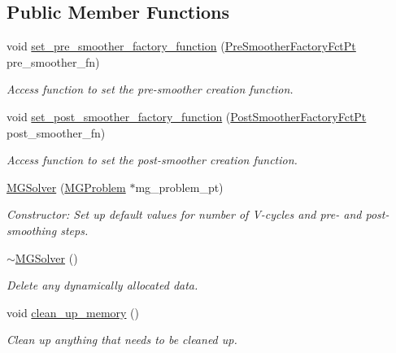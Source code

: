 \subsection*{Public Member Functions}
\begin{DoxyCompactItemize}
\item 
void \hyperlink{classoomph_1_1MGSolver_a0c783dddf9108f26b835509fddec6938}{set\+\_\+pre\+\_\+smoother\+\_\+factory\+\_\+function} (\hyperlink{classoomph_1_1MGSolver_a43de5ad4985ae1bbe68388619a9db32a}{Pre\+Smoother\+Factory\+Fct\+Pt} pre\+\_\+smoother\+\_\+fn)
\begin{DoxyCompactList}\small\item\em Access function to set the pre-\/smoother creation function. \end{DoxyCompactList}\item 
void \hyperlink{classoomph_1_1MGSolver_a451bf822bb1b42c8cdd8ed3fbb3a7be4}{set\+\_\+post\+\_\+smoother\+\_\+factory\+\_\+function} (\hyperlink{classoomph_1_1MGSolver_a72fa4eb80c0b5a0ec6811dcd92b30231}{Post\+Smoother\+Factory\+Fct\+Pt} post\+\_\+smoother\+\_\+fn)
\begin{DoxyCompactList}\small\item\em Access function to set the post-\/smoother creation function. \end{DoxyCompactList}\item 
\hyperlink{classoomph_1_1MGSolver_a61354743e9989dc8eb69efe2b1414cfa}{M\+G\+Solver} (\hyperlink{classoomph_1_1MGProblem}{M\+G\+Problem} $\ast$mg\+\_\+problem\+\_\+pt)
\begin{DoxyCompactList}\small\item\em Constructor\+: Set up default values for number of V-\/cycles and pre-\/ and post-\/smoothing steps. \end{DoxyCompactList}\item 
\hyperlink{classoomph_1_1MGSolver_aae6259c5553a6570841e689b63bd691d}{$\sim$\+M\+G\+Solver} ()
\begin{DoxyCompactList}\small\item\em Delete any dynamically allocated data. \end{DoxyCompactList}\item 
void \hyperlink{classoomph_1_1MGSolver_a85e3e6f32b4e77d696d5b001e1428f08}{clean\+\_\+up\+\_\+memory} ()
\begin{DoxyCompactList}\small\item\em Clean up anything that needs to be cleaned up. \end{DoxyCompactList}\item 

\end{DoxyCompactItemize}

